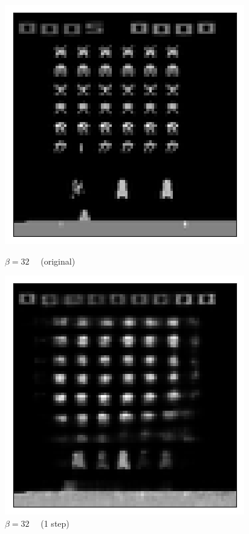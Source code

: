 \begin{figure}[h!]
\begin{multicols}{4}
    \includegraphics[scale=0.4]{figures/results/indiscriminate_decoupling/beta_4_posterior_sample_original.png}
    \caption{$\beta=32\quad$ (original)}
    \includegraphics[scale=0.4]{figures/results/indiscriminate_decoupling/beta_32_posterior_sample_0.png}
    \caption{$\beta=32\quad$ (1 step)}

\end{multicols}
\end{figure}
